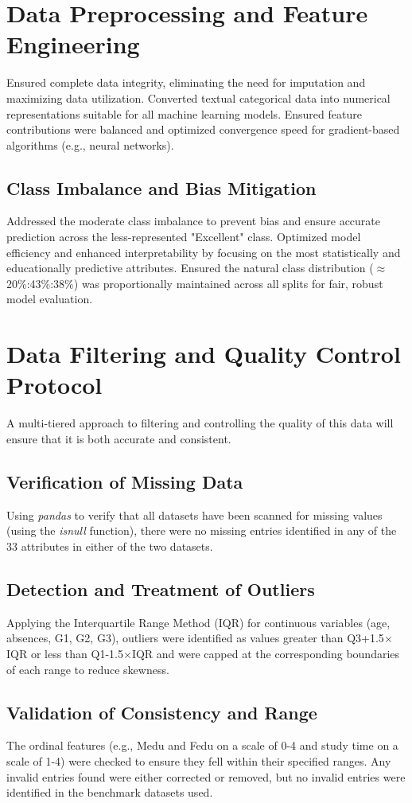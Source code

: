 \documentclass[twocolumn]{svjour3}
\begin{document}
\section{Data Preprocessing and Feature Engineering}
Ensured complete data integrity, eliminating the need for imputation and maximizing data utilization.
Converted textual categorical data into numerical representations suitable for all machine learning models.
Ensured feature contributions were balanced and optimized convergence speed for gradient-based algorithms (e.g., neural networks).
\subsection{Class Imbalance and Bias Mitigation}
Addressed the moderate class imbalance to prevent bias and ensure accurate prediction across the less-represented "Excellent" class.
Optimized model efficiency and enhanced interpretability by focusing on the most statistically and educationally predictive attributes.
Ensured the natural class distribution ($\approx$20\%:43\%:38\%) was proportionally maintained across all splits for fair, robust model evaluation.
\section{Data Filtering and Quality Control Protocol}
A multi-tiered approach to filtering and controlling the quality of this data will ensure that it is both accurate and consistent.
\subsection{Verification of Missing Data}
Using \textit{pandas} to verify that all datasets have been scanned for missing values (using the \textit{isnull} function), there were no missing entries identified in any of the 33 attributes in either of the two datasets.
\subsection{Detection and Treatment of Outliers}
Applying the Interquartile Range Method (IQR) for continuous variables (age, absences, G1, G2, G3), outliers were identified as values greater than Q3+1.5$\times$IQR or less than Q1-1.5$\times$IQR and were capped at the corresponding boundaries of each range to reduce skewness.
\subsection{Validation of Consistency and Range}
The ordinal features (e.g., Medu and Fedu on a scale of 0-4 and study time on a scale of 1-4) were checked to ensure they fell within their specified ranges. Any invalid entries found were either corrected or removed, but no invalid entries were identified in the benchmark datasets used.
\end{document}
